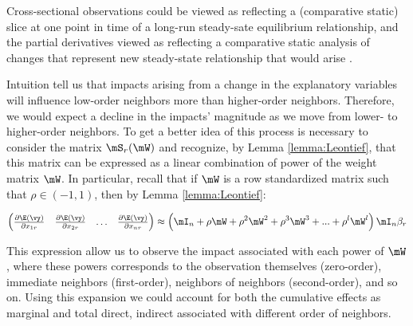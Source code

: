 \documentclass[english,12pt]{book}\usepackage[]{graphicx}\usepackage[]{xcolor}
\begin{document}
\begin{remark}
Cross-sectional observations could be viewed as reflecting a (comparative static) slice at one point in time of a long-run steady-sate equilibrium relationship, and the partial derivatives viewed as reflecting a comparative static analysis of changes that represent new steady-state relationship that would arise \citep{lesage2014regional}.
\end{remark}

Intuition tell us that impacts arising from a change in the explanatory variables will influence low-order neighbors more than higher-order neighbors. Therefore, we would expect a decline in the impacts' magnitude as we move from lower- to higher-order neighbors. To get a better idea of this process is necessary to consider the matrix $\mS_r(\mW)$ and recognize, by Lemma \ref{lemma:Leontief}, that this matrix can be expressed as a linear combination of power of the weight matrix $\mW$. In particular, recall that if $\mW$ is a row standardized matrix such that $\rho \in (-1, 1)$, then by Lemma \ref{lemma:Leontief}:

\begin{equation}
  \begin{pmatrix}
  \frac{\partial \E(\vy)}{\partial x_{1r}} & \frac{\partial \E(\vy)}{\partial x_{2r}} & \hdots & \frac{\partial \E(\vy)}{\partial x_{nr}} 
   \end{pmatrix} \approx \left(\mI_n  + \rho \mW + \rho^2\mW^2 + \rho^3\mW^3 + ... + \rho^l\mW^l\right)\mI_n\beta_r  
\end{equation}
    
This expression allow us to observe the impact associated with each power of $\mW$, where these powers corresponds to the observation themselves (zero-order), immediate neighbors (first-order), neighbors of neighbors (second-order), and so on. Using this expansion we could account for both the cumulative effects as marginal and total direct, indirect associated with different order of neighbors.

% 
% 
% 
% 
% 
\end{document}
